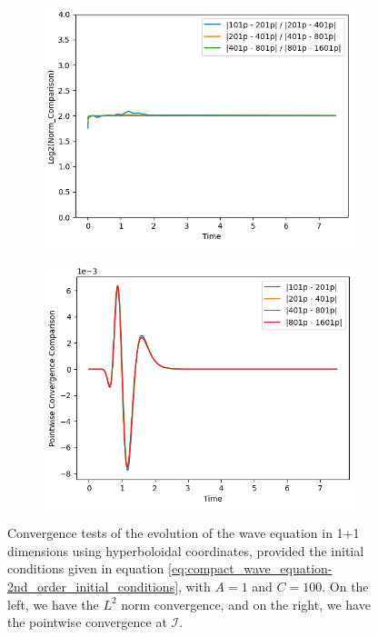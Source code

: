 \begin{figure}[h]
    \centering
    \begin{subfigure}[b]{0.45\textwidth}
        \centering
        \includegraphics[width=\textwidth]{Images/Wave_Equation_1+1-Norm.png}
    \end{subfigure}
    \hfill
    \begin{subfigure}[b]{0.45\textwidth}
        \centering
        \includegraphics[width=\textwidth]{Images/Wave_Equation_1+1-Pointwise.png}
    \end{subfigure}
    \caption{Convergence tests of the evolution of the wave equation in 1+1 dimensions using hyperboloidal coordinates, provided the initial conditions given in equation \ref{eq:compact_wave_equation-2nd_order_initial_conditions}, with $A = 1$ and $C = 100$. On the left, we have the $L^2$ norm convergence, and on the right, we have the pointwise convergence at $\mathscr{I}$.}
    \label{fig:compact_wave_equation-2nd_order-convergence}
\end{figure}